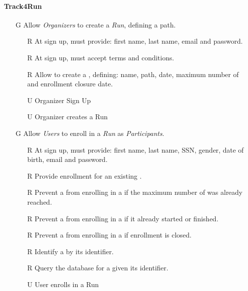\documentclass[../../../rasd.tex]{subfiles}
\begin{document}
\paragraph{Track4Run}
\begin{itemize}
    \item[G\subs{8}]Allow \textit{Organizers} to create a \textit{Run}, defining a path.
    \begin{itemize}
        \item[R\subs{39}]At sign up,  must provide: first name, last name, email and password.
        \item[R\subs{40}]At sign up,  must accept terms and conditions.
        \item[R\subs{41}]Allow  to create a , defining: name, path, date, maximum number of  and enrollment closure date. 
        \\
        \item[U\subs{13}]Organizer Sign Up  
        \item[U\subs{14}]Organizer creates a Run
    \end{itemize}

    \item[G\subs{9}]Allow \textit{Users} to enroll in a \textit{Run} as \textit{Participants}. 
    \begin{itemize}
    \item[R\subs{2}]At sign up,  must provide: first name, last name, SSN, gender, date of birth, email and password.
        \item[R\subs{42}]Provide  enrollment for an existing .
        \item[R\subs{43}]Prevent a  from enrolling in a  if the maximum number of  was already reached.
        \item[R\subs{44}]Prevent a  from enrolling in a  if it already started or finished.
        \item[R\subs{45}]Prevent a  from enrolling in a  if enrollment is closed.
        \item[R\subs{47}]Identify a  by its identifier.
        \item[R\subs{48}]Query the database for a  given its identifier.
        \\
        \item[U\subs{15}]User enrolls in a Run
    \end{itemize}


\end{itemize}
\end{document}
